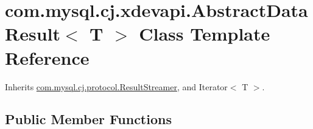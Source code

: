 \hypertarget{classcom_1_1mysql_1_1cj_1_1xdevapi_1_1_abstract_data_result}{}\section{com.\+mysql.\+cj.\+xdevapi.\+Abstract\+Data\+Result$<$ T $>$ Class Template Reference}
\label{classcom_1_1mysql_1_1cj_1_1xdevapi_1_1_abstract_data_result}


Inherits \mbox{\hyperlink{interfacecom_1_1mysql_1_1cj_1_1protocol_1_1_result_streamer}{com.\+mysql.\+cj.\+protocol.\+Result\+Streamer}}, and Iterator$<$ T $>$.

\subsection*{Public Member Functions}
